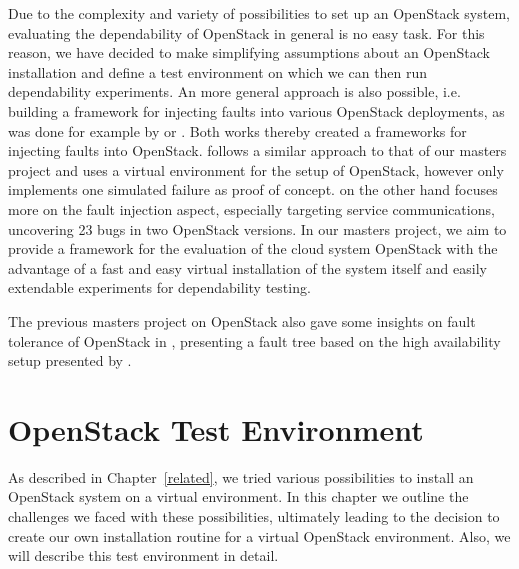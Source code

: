Due to the complexity and variety of possibilities to set up an OpenStack system, evaluating the dependability of OpenStack in general is no easy task. For this reason, we have decided to make simplifying assumptions about an OpenStack installation and define a test environment on which we can then run dependability experiments. An more general approach is also possible, i.e. building a framework for injecting faults into various OpenStack deployments, as was done for example by \cite{Kollarova} or \cite{Ju}. Both works thereby created a frameworks for injecting faults into OpenStack. \cite{Kollarova} follows a similar approach to that of our masters project and uses a virtual environment for the setup of OpenStack, however only implements one simulated failure as proof of concept. \cite{Ju} on the other hand focuses more on the fault injection aspect, especially targeting service communications, uncovering 23 bugs in two OpenStack versions. In our masters project, we aim to provide a framework for the evaluation of the cloud system OpenStack with the advantage of a fast and easy virtual installation of the system itself and easily extendable experiments for dependability testing.

The previous masters project on OpenStack also gave some insights on fault tolerance of OpenStack in \cite{MP14}, presenting a fault tree based on the high availability setup presented by \cite{Teng}.


\section{OpenStack Test Environment}
As described in Chapter~\ref{related}, we tried various possibilities to install an OpenStack system on a virtual environment. In this chapter we outline the challenges we faced with these possibilities, ultimately leading to the decision to create our own installation routine for a virtual OpenStack environment. Also, we will describe this test environment in detail.

